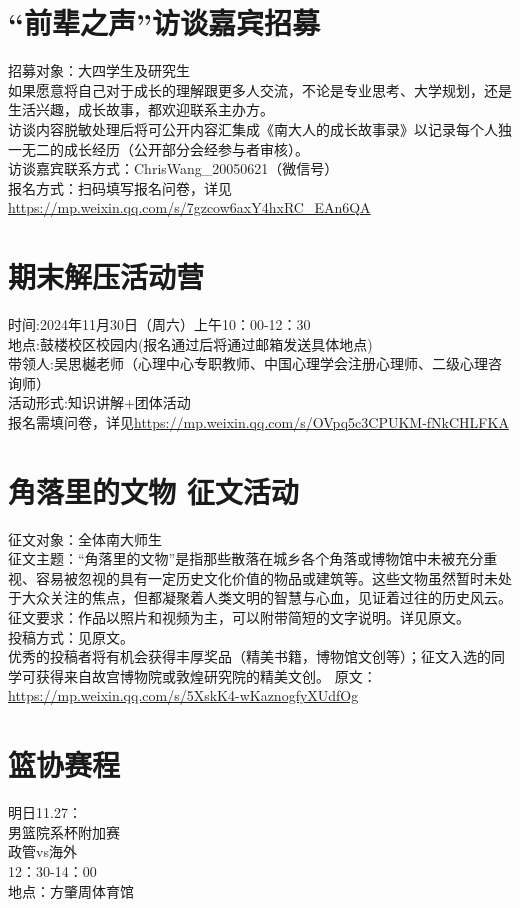 \documentclass[letterpaper, 12pt]{article}
\begin{document}
\begin{multicols}{2}
\section{“前辈之声”访谈嘉宾招募}
招募对象：大四学生及研究生\\
如果愿意将自己对于成长的理解跟更多人交流，不论是专业思考、大学规划，还是生活兴趣，成长故事，都欢迎联系主办方。\\
访谈内容脱敏处理后将可公开内容汇集成《南大人的成长故事录》以记录每个人独一无二的成长经历（公开部分会经参与者审核）。\\
访谈嘉宾联系方式：ChrisWang\_20050621（微信号）\\
报名方式：扫码填写报名问卷，详见\url{https://mp.weixin.qq.com/s/7gzcow6axY4hxRC_EAn6QA}

\section{期末解压活动营}
时间:2024年11月30日（周六）上午10：00-12：30\\
地点:鼓楼校区校园内(报名通过后将通过邮箱发送具体地点)\\
带领人:吴思樾老师（心理中心专职教师、中国心理学会注册心理师、二级心理咨询师）\\
活动形式:知识讲解+团体活动\\
报名需填问卷，详见\url{https://mp.weixin.qq.com/s/OVpq5c3CPUKM-fNkCHLFKA}

\section{角落里的文物 征文活动}
征文对象：全体南大师生\\
征文主题：“角落里的文物”是指那些散落在城乡各个角落或博物馆中未被充分重视、容易被忽视的具有一定历史文化价值的物品或建筑等。这些文物虽然暂时未处于大众关注的焦点，但都凝聚着人类文明的智慧与心血，见证着过往的历史风云。\\
征文要求：作品以照片和视频为主，可以附带简短的文字说明。详见原文。\\
投稿方式：见原文。\\
优秀的投稿者将有机会获得丰厚奖品（精美书籍，博物馆文创等）；征文入选的同学可获得来自故宫博物院或敦煌研究院的精美文创。
原文：\url{https://mp.weixin.qq.com/s/5XskK4-wKaznogfyXUdfOg}

\section{篮协赛程}
明日11.27：\\
男篮院系杯附加赛\\
政管vs海外\\
12：30-14：00\\
地点：方肇周体育馆

\end{multicols}
\end{document}
